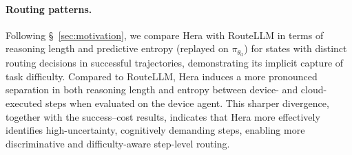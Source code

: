 \documentclass{article}
\newcommand{\needrev}[1]{{\color{darkgreen}#1}} %
\newcommand{\needrev}[1]{#1} %
\newcommand{\name}{Hera\xspace}
\begin{document}
\vspace{-.5em}
\paragraph{Routing patterns.}
Following \S~\ref{sec:motivation}, we compare \name with RouteLLM in terms of reasoning length and predictive entropy (replayed on $\pi_{\theta_\mathrm{d}}$) for states with distinct routing decisions in successful trajectories, demonstrating its implicit capture of task difficulty.
Compared to RouteLLM, \name induces a more pronounced separation in both reasoning length and entropy between device- and cloud-executed steps when evaluated on the device agent.
This sharper divergence, together with the success--cost results, indicates that \name more effectively identifies high-uncertainty, cognitively demanding steps, enabling more discriminative and difficulty-aware step-level routing.


\end{document}
